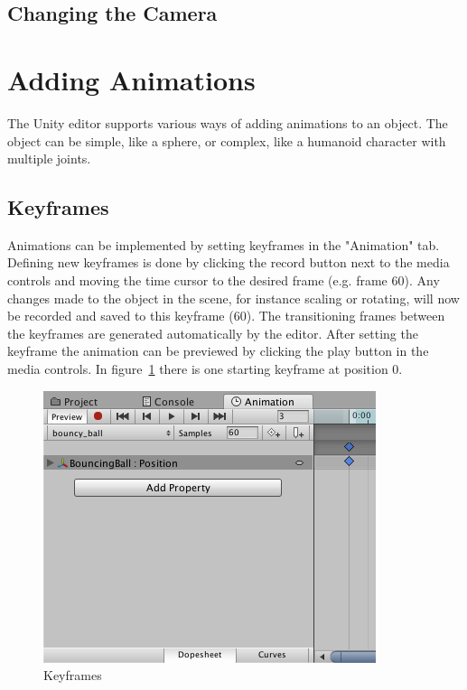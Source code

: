 \documentclass[12pt, a4paper, titlepage]{article}
\begin{document}
\lstset{
basicstyle=\ttfamily\small,
numbers=left,
breaklines=true,
numberstyle=\tiny,
numbersep=5pt,
tabsize=3
}

\lstset{language=[Sharp]C}

\subsection{Changing the Camera}


\section{Adding Animations}

The Unity editor supports various ways of adding animations to an object. The object can be simple, like a sphere, or complex, like a humanoid character with multiple joints. 

\subsection{Keyframes}

Animations can be implemented by setting keyframes in the "Animation" tab. Defining new keyframes is done by clicking the record button next to the media controls and moving the time cursor to the desired frame (e.g. frame 60). Any changes made to the object in the scene, for instance scaling or rotating, will now be recorded and saved to this keyframe (60). The transitioning frames between the keyframes are generated automatically by the editor. After setting the keyframe the animation can be previewed by clicking the play button in the media controls. In figure~\ref{fig:adding_animations_keyframes} there is one starting keyframe at position 0.

\begin{figure}[htbp]
  \centering
  \includegraphics[width=.4\textwidth]{pictures/keyframes}
  \caption{Keyframes}
  \label{fig:adding_animations_keyframes}
\end{figure}
\end{document}
